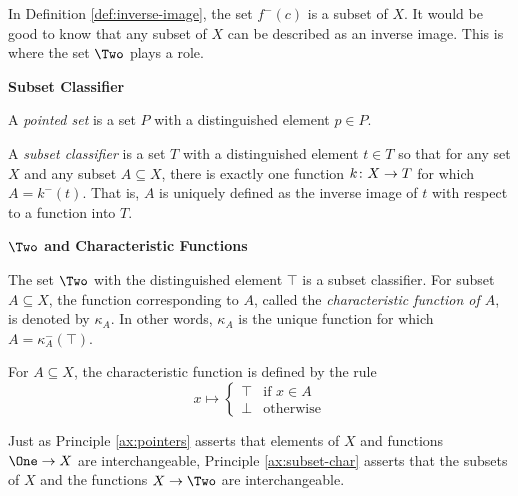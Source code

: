 In Definition \ref{def:inverse-image}, the set $f^-(c)$ is a subset of $X$.
It would be good to know that any subset of $X$ can be described as an inverse image.
This is where the set $\Two$ plays a role.

\begin{defn}\label{def:subset-classifier}
	\noindent\textbf{Subset Classifier}
	
	A \emph{pointed set} is a set $P$ with a distinguished element $p\in P$.
	
	A \emph{subset classifier} is a set $T$ with a distinguished element $t\in T$ so that for any set $X$ and any subset $A\subseteq X$, there is exactly one function ${k}\colon{X}\to{T}$ for which $A = k^-(t)$.
	That is, $A$ is uniquely defined as the inverse image of $t$ with respect to a function into $T$.
\end{defn}

\begin{principle}\label{ax:subset-char}
	\noindent\textbf{$\Two$ and Characteristic Functions}
	
	The set $\Two$ with the distinguished element $\top$ is a subset classifier.
	For subset $A\subseteq X$, the function corresponding to $A$, called the \emph{characteristic function of $A$}, is denoted by $\kappa_A$.
	In other words, $\kappa_A$ is the unique function for which $A = \kappa_A^-(\top)$.

	For $A\subseteq X$, the characteristic function is defined by the rule
	\[
	x \mapsto
		\begin{cases}
			\top &\text{if $x\in A$}\\
			\bot &\text{otherwise}
		\end{cases}
	\]
\end{principle}

Just as Principle \ref{ax:pointers} asserts that elements of $X$ and functions $\One\to X$ are interchangeable, Principle \ref{ax:subset-char} asserts that the subsets of $X$ and the functions $X\to\Two$ are interchangeable.

